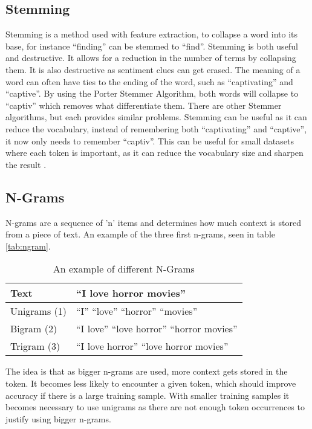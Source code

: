 \subsection{Stemming}\label{subsec:Stem}
Stemming is a method used with feature extraction, to collapse a word into its
base, for instance ``finding'' can be stemmed to ``find''. Stemming is both
useful and destructive. It allows for a reduction in the number of terms by
collapsing them. It is also destructive as sentiment clues can get erased. The
meaning of a word can often have ties to the ending of the word, such as
``captivating'' and ``captive''. By using the Porter Stemmer Algorithm, both
words will collapse to ``captiv'' which removes what differentiate them. There
are other Stemmer algorithms, but each provides similar problems. Stemming can
be useful as it can reduce the vocabulary, instead of remembering both
``captivating'' and ``captive'', it now only needs to remember ``captiv''. This
can be useful for small datasets where each token is important, as it can reduce
the vocabulary size and sharpen the result \citep[Ch 3.b]{Sentiment}.

\subsection{N-Grams}
N-grams are a sequence of 'n' items and determines how much context is stored
from a piece of text. An example of the three first n-grams, seen in
table \autoref{tab:ngram}.

\begin{table}[H]
\centering
\begin{tabular}{|l|l|}
\hline
Text & ``I love horror movies'' \\ \hline
Unigrams (1) &
``I'' ``love'' ``horror'' ``movies''
\\ \hline 
Bigram (2) &
``I love'' ``love horror'' ``horror movies''
\\ \hline
Trigram (3) &
``I love horror'' ``love horror movies''
\\ \hline
\end{tabular}
\caption{An example of different N-Grams}
\label{tab:ngram}
\end{table}

The idea is that as bigger n-grams are used, more context gets stored in the
token. It becomes less likely to encounter a given token, which should
improve accuracy if there is a large training sample. With smaller training
samples it becomes necessary to use unigrams as there are not enough
token occurrences to justify using bigger n-grams.

